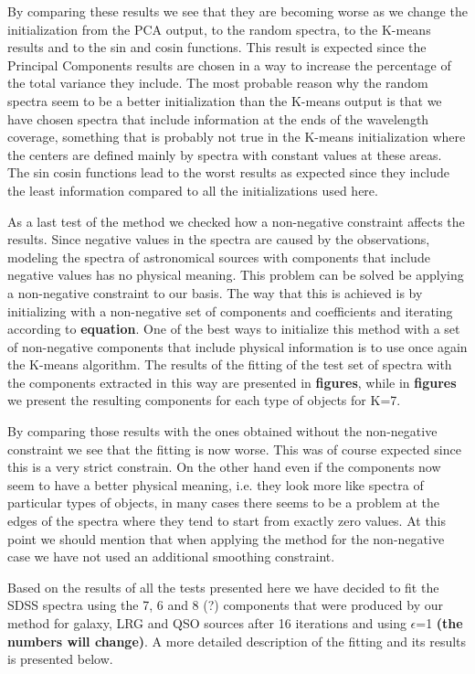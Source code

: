 \documentclass[12pt]{article}
\begin{document}
By comparing these results we see that they are becoming worse as we change the initialization from the PCA output, to the random spectra, to the K-means results and to the sin and cosin functions. This result is expected since the Principal Components results are chosen in a way to increase the percentage of the total variance they include. The most probable reason why the random spectra seem to be a better initialization than the K-means output is that we have chosen spectra that include information at the ends of the wavelength coverage, something that is probably not true in the K-means initialization where the centers are defined mainly by spectra with constant values at these areas. The sin cosin functions lead to the worst results as expected since they include the least information compared to all the initializations used here.

As a last test of the method we checked how a non-negative constraint affects the results. Since negative values in the spectra are caused by the observations, modeling the spectra of astronomical sources with components that include negative values has no physical meaning. This problem can be solved be applying a non-negative constraint to our basis. The way that this is achieved is by initializing with a non-negative set of components and coefficients and iterating according to \textbf{equation}. One of the best ways to initialize this method with a set of non-negative components that include physical information is to use once again the K-means algorithm. The results of the fitting of the test set of spectra with the components extracted in this way are presented in \textbf{figures}, while in \textbf{figures} we present the resulting components for each type of objects for K=7.

By comparing those results with the ones obtained without the non-negative constraint we see that the fitting is now worse. This was of course expected since this is a very strict constrain. On the other hand even if the components now seem to have a better physical meaning, i.e. they look more like spectra of particular types of objects, in many cases there seems to be a problem at the edges of the spectra where they tend to start from exactly zero values. At this point we should mention that when applying the method for the non-negative case we have not used an additional smoothing constraint.

Based on the results of all the tests presented here we have decided to fit the SDSS spectra using the 7, 6 and 8 (?) components that were produced by our method for galaxy, LRG and QSO sources after 16 iterations and using $\epsilon$=1 \textbf{(the numbers will change)}. A more detailed description of the fitting and its results is presented below.
\end{document}
